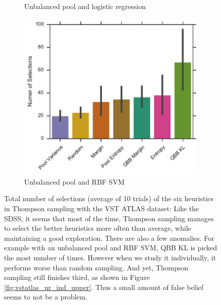 \begin{figure}[p]
\begin{subfigure}{.5\textwidth}
        \caption{Unbalanced pool and logistic regression}
        \label{fig:vstatlas_ul_no_selections}
    \end{subfigure}%
    \begin{subfigure}{.5\textwidth}
        \centering
        \includegraphics[width=\linewidth]{figures/5_thompson/vstatlas_ur_no_selections}
        \caption{Unbalanced pool and RBF SVM}
        \label{fig:vstatlas_ur_no_selections}
    \end{subfigure}
    \caption[Total number of heuristic selections (VST ATLAS)]{Total number of selections (average
        of 10 trials) of the six heuristics in Thompson sampling with the VST ATLAS dataset: Like the
        SDSS, it seems that most of the time, Thompson sampling manages to select the better
        heuristics more often than average, while maintaining a good exploration. There are also a few
        anomalies. For example with an unbalanced pool and RBF SVM, QBB KL is picked the most number of times. However when we study it individually, it performs worse than random sampling. And yet, Thompson sampling still finishes third, as shown in Figure \ref{fig:vstatlas_ur_ind_upper}. Thus a small amount of false belief seems to not be a problem.}
    
    \label{fig:vstatlas_no_selections}
\end{figure}


